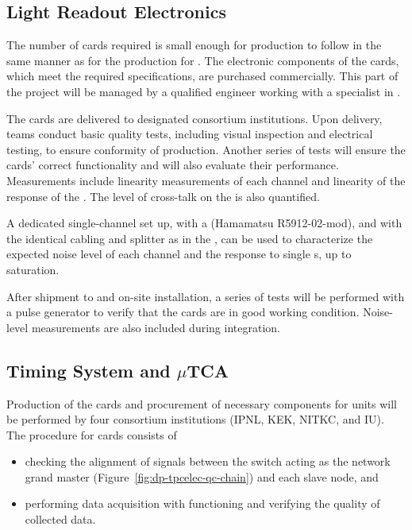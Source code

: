 \subsection{Light Readout Electronics}
\label{ssec:dp-tpcelec-prod-lro}


The number of   cards required is small enough for production to follow in the same manner as for the production for .
The electronic components of the cards, which meet the required specifications, are purchased commercially. This part of the project will be managed by a qualified engineer working with a specialist in .

The cards are delivered to designated consortium institutions. Upon delivery, teams conduct basic quality tests, including visual inspection and electrical testing, to ensure conformity of production. Another series of tests will ensure the cards' %
correct %
functionality and will also evaluate their performance. Measurements include linearity measurements of each  channel and linearity of the response of the . The level of cross-talk on the  is also quantified. 

A dedicated single-channel set up, with a  (Hamamatsu R5912-02-mod), and with the identical cabling and splitter as in the , can be used to characterize the expected noise level of each channel and the response to single \phel{}s, up to saturation. 

After shipment to  and on-site installation, a series of tests will be performed with a pulse generator to verify that the cards are in good working condition. Noise-level measurements are also included during integration.


\subsection{Timing System and $\mu$TCA}
\label{ssec:dp-tpcelec-prod-utca}

Production of the cards and procurement of necessary  components for  units will be performed by four consortium institutions (IPNL, KEK, NITKC, and IU). The  procedure for  cards consists of 
\begin{itemize}
\item{checking the alignment of  signals between the  switch acting as the network grand master (Figure~\ref{fig:dp-tpcelec-qc-chain}) and each  slave node, and }
\item{performing data acquisition with functioning  and verifying the quality of collected data.}
\end{itemize}

